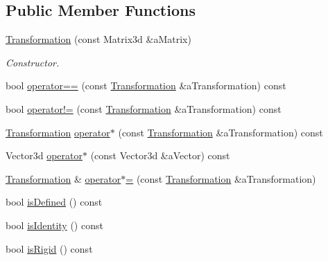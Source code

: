 \subsection*{Public Member Functions}
\begin{DoxyCompactItemize}
\item 
\hyperlink{classostk_1_1math_1_1geom_1_1d2_1_1_transformation_ae1bda9d4a0795afcafa3b0d750492cba}{Transformation} (const Matrix3d \&a\+Matrix)
\begin{DoxyCompactList}\small\item\em Constructor. \end{DoxyCompactList}\item 
bool \hyperlink{classostk_1_1math_1_1geom_1_1d2_1_1_transformation_adde6da25e03d6015ebc3becdcb414354}{operator==} (const \hyperlink{classostk_1_1math_1_1geom_1_1d2_1_1_transformation}{Transformation} \&a\+Transformation) const
\item 
bool \hyperlink{classostk_1_1math_1_1geom_1_1d2_1_1_transformation_ae28c6eae5981de020c50e517c051a5f2}{operator!=} (const \hyperlink{classostk_1_1math_1_1geom_1_1d2_1_1_transformation}{Transformation} \&a\+Transformation) const
\item 
\hyperlink{classostk_1_1math_1_1geom_1_1d2_1_1_transformation}{Transformation} \hyperlink{classostk_1_1math_1_1geom_1_1d2_1_1_transformation_ad34d7313a9f489b60f2abbf6738fb97f}{operator$\ast$} (const \hyperlink{classostk_1_1math_1_1geom_1_1d2_1_1_transformation}{Transformation} \&a\+Transformation) const
\item 
Vector3d \hyperlink{classostk_1_1math_1_1geom_1_1d2_1_1_transformation_aa276f9ef6cc38a77bc1843a34a48b15a}{operator$\ast$} (const Vector3d \&a\+Vector) const
\item 
\hyperlink{classostk_1_1math_1_1geom_1_1d2_1_1_transformation}{Transformation} \& \hyperlink{classostk_1_1math_1_1geom_1_1d2_1_1_transformation_a79edc1db9516dd543511e4103044535c}{operator$\ast$=} (const \hyperlink{classostk_1_1math_1_1geom_1_1d2_1_1_transformation}{Transformation} \&a\+Transformation)
\item 
bool \hyperlink{classostk_1_1math_1_1geom_1_1d2_1_1_transformation_ae9db50abaa9f9aa366e694890d1d0c29}{is\+Defined} () const
\item 
bool \hyperlink{classostk_1_1math_1_1geom_1_1d2_1_1_transformation_a4e42243754d95628f069806739b3538d}{is\+Identity} () const
\item 
bool \hyperlink{classostk_1_1math_1_1geom_1_1d2_1_1_transformation_a2a6902ddc2054bb735db0c9a19bcb141}{is\+Rigid} () const

\end{DoxyCompactItemize}
